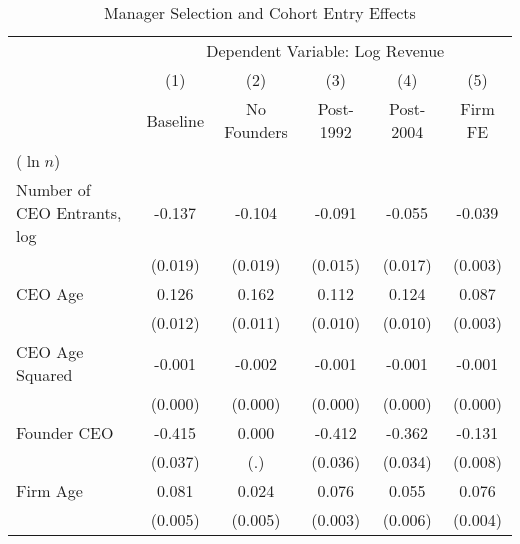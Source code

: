 \begin{table}[htbp]\centering
\caption{Manager Selection and Cohort Entry Effects}\label{tab:cohort\_selection}
\begin{threeparttable}
\begin{tabular}{lccccc}
\toprule
            &\multicolumn{5}{c}{Dependent Variable: Log Revenue}                                                          \\\cmidrule(lr){2-6}
            &\multicolumn{1}{c}{(1)}&\multicolumn{1}{c}{(2)}&\multicolumn{1}{c}{(3)}&\multicolumn{1}{c}{(4)}&\multicolumn{1}{c}{(5)}\\
            &\multicolumn{1}{c}{Baseline}&\multicolumn{1}{c}{No Founders}&\multicolumn{1}{c}{Post-1992}&\multicolumn{1}{c}{Post-2004}&\multicolumn{1}{c}{Firm FE}\\
\midrule
($\ln n$)   &                     &                     &                     &                     &                     \\
\addlinespace
Number of CEO Entrants, log&      -0.137\sym{***}&      -0.104\sym{***}&      -0.091\sym{***}&      -0.055\sym{***}&      -0.039\sym{***}\\
            &     (0.019)         &     (0.019)         &     (0.015)         &     (0.017)         &     (0.003)         \\
\addlinespace
CEO Age     &       0.126\sym{***}&       0.162\sym{***}&       0.112\sym{***}&       0.124\sym{***}&       0.087\sym{***}\\
            &     (0.012)         &     (0.011)         &     (0.010)         &     (0.010)         &     (0.003)         \\
\addlinespace
CEO Age Squared&      -0.001\sym{***}&      -0.002\sym{***}&      -0.001\sym{***}&      -0.001\sym{***}&      -0.001\sym{***}\\
            &     (0.000)         &     (0.000)         &     (0.000)         &     (0.000)         &     (0.000)         \\
\addlinespace
Founder CEO &      -0.415\sym{***}&       0.000         &      -0.412\sym{***}&      -0.362\sym{***}&      -0.131\sym{***}\\
            &     (0.037)         &         (.)         &     (0.036)         &     (0.034)         &     (0.008)         \\
\addlinespace
Firm Age    &       0.081\sym{***}&       0.024\sym{***}&       0.076\sym{***}&       0.055\sym{***}&       0.076\sym{***}\\
            &     (0.005)         &     (0.005)         &     (0.003)         &     (0.006)         &     (0.004)         \\

\end{tabular}
\end{threeparttable}
\end{table}
